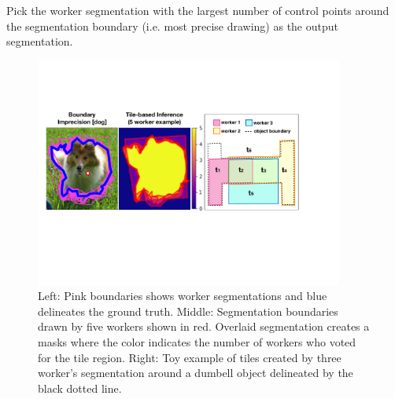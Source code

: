 \par \noindent Pick the worker segmentation with the largest number of control points around the segmentation boundary (i.e. most precise drawing) as the output segmentation.

\begin{figure}[h!]
\centering
\includegraphics[width=0.9\textwidth]{plots/precision_issue_tile_example.pdf}
\caption{Left: Pink boundaries shows worker segmentations and blue delineates the ground truth. Middle: Segmentation boundaries drawn by five workers shown in red. Overlaid segmentation creates a masks where the color indicates the number of workers who voted for the tile region. Right: Toy example of tiles created by three worker's segmentation around a dumbell object delineated by the black dotted line.}
\label{tile_demo}
\setlength{\abovecaptionskip}{-10pt}
\setlength{\belowcaptionskip}{-30pt}
\end{figure}  